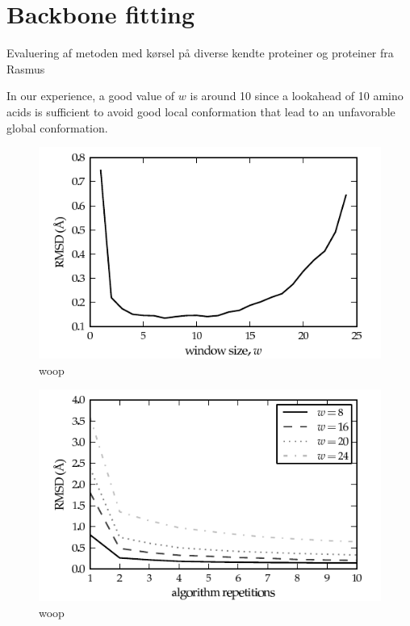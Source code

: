 
\section{Backbone fitting}

Evaluering af metoden med kørsel på diverse kendte proteiner og
proteiner fra Rasmus

In our experience, a good value of $w$ is around 10 since a lookahead of 10 amino acids is sufficient to avoid good local conformation that lead to an unfavorable global conformation.
\begin{figure}
	\centering
	\hspace*{-3.5mm}\includegraphics[width=1.1\columnwidth]{figures/plot_rmsd}
	\caption{woop}
\end{figure}

\begin{figure}
	\centering
	\hspace*{-3.5mm}\includegraphics[width=1.1\columnwidth]{figures/plot_rmsd_convergence}
	\caption{woop}
\end{figure}

